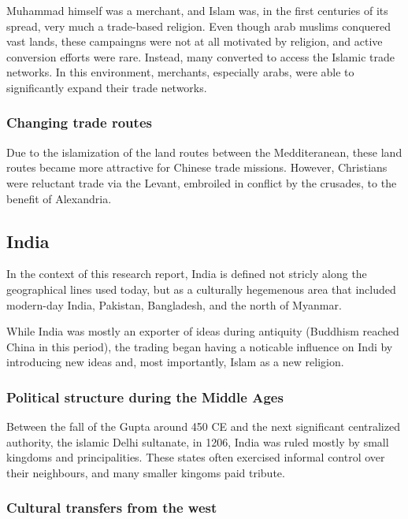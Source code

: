 \documentclass[11pt, a4paper, headings=standardclasses]{scrartcl}
\begin{document}
Muhammad himself was a merchant\autocite{Muhammad}, and Islam was, in the first centuries of its spread, very much a trade-based religion. Even though arab muslims conquered vast lands, these campaingns were not at all motivated by religion\autocite[200]{Lapidus}, and active conversion efforts were rare. Instead, many converted to access the Islamic trade networks.\autocite{SilkRoadIslam} In this environment, merchants, especially arabs, were able to significantly expand their trade networks.

\subsubsection{Changing trade routes}

Due to the islamization of the land routes between the Medditeranean, these land routes became more attractive for Chinese trade missions. However, Christians were reluctant trade via the Levant, embroiled in conflict by the crusades, to the benefit of Alexandria.\autocite[Paragraph 5]{UN}

\subsection{India}

In the context of this research report, India is defined not stricly along the geographical lines used today, but as a culturally hegemenous area that included modern-day India, Pakistan, Bangladesh, and the north of Myanmar.

While India was mostly an exporter of ideas during antiquity (Buddhism reached China in this period\autocite{SilkRoadIslam}), the trading began having a noticable influence on Indi by introducing new ideas and, most importantly, Islam as a new religion.

\subsubsection{Political structure during the Middle Ages}

Between the fall of the Gupta around 450 CE\autocite[Section \textit{Gupta}]{India} and the next significant centralized authority, the islamic Delhi sultanate, in 1206\autocite{Delhi}, India was ruled mostly by small kingdoms and principalities. These states often exercised informal control over their neighbours, and many smaller kingoms paid tribute.\autocite{India}

\subsubsection{Cultural transfers from the west}
\end{document}
